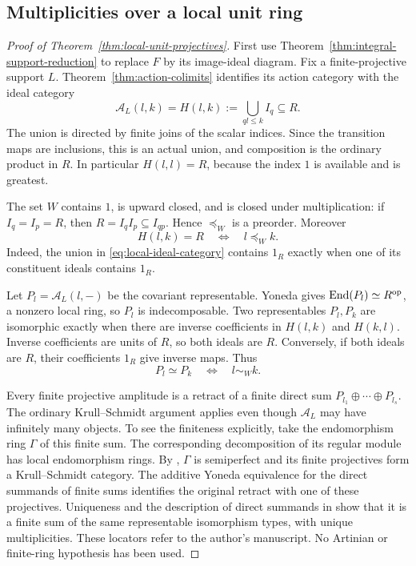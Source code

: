 \subsection{Multiplicities over a local unit ring}
\label{subsec:local-unit-projectives}

\begin{proof}[Proof of Theorem~\ref{thm:local-unit-projectives}]
First use Theorem~\ref{thm:integral-support-reduction} to replace $F$ by
its image-ideal diagram. Fix a finite-projective support $L$.
Theorem~\ref{thm:action-colimits} identifies its action category with
the ideal category
\begin{equation}\label{eq:local-ideal-category}
 \mathcal A_L(l,k)=H(l,k):=\bigcup_{ql\leq k}I_q\subseteq R.
\end{equation}
The union is directed by finite joins of the scalar indices. Since the
transition maps are inclusions, this is an actual union, and composition
is the ordinary product in $R$. In particular $H(l,l)=R$, because the
index $1$ is available and is greatest.

The set $W$ contains $1$, is upward closed, and is closed under
multiplication: if $I_q=I_p=R$, then
$R=I_qI_p\subseteq I_{qp}$. Hence $\preceq_W$ is a preorder. Moreover
\[
 H(l,k)=R\quad\Longleftrightarrow\quad l\preceq_W k.
\]
Indeed, the union in \eqref{eq:local-ideal-category} contains $1_R$
exactly when one of its constituent ideals contains $1_R$.

Let $P_l=\mathcal A_L(l,-)$ be the covariant representable. Yoneda gives
$\operatorname{End}(P_l)\simeq R^{\mathrm{op}}$, a nonzero local ring, so $P_l$ is
indecomposable. Two representables $P_l,P_k$ are isomorphic exactly
when there are inverse coefficients in $H(l,k)$ and $H(k,l)$.
Inverse coefficients are units of $R$, so both ideals are $R$.
Conversely, if both ideals are $R$, their coefficients $1_R$ give
inverse maps. Thus
\[
 P_l\simeq P_k\quad\Longleftrightarrow\quad l\sim_W k.
\]

Every finite projective amplitude is a retract of a finite direct sum
$P_{l_1}\oplus\cdots\oplus P_{l_s}$. The ordinary Krull--Schmidt
argument applies even though $\mathcal A_L$ may have infinitely many
objects. To see the finiteness explicitly, take the endomorphism ring
$\Gamma$ of this finite sum. The corresponding decomposition of its
regular module has local endomorphism rings. By
\cite[Proposition~4.1, pp.~8--9]{Krause}, $\Gamma$ is semiperfect and
its finite projectives form a Krull--Schmidt category. The additive
Yoneda equivalence for the direct summands of finite sums identifies
the original retract with one of these projectives. Uniqueness and
the description of direct summands in
\cite[Theorem~4.2 and Corollary~4.3, p.~9]{Krause} show that it is a
finite sum of the same representable isomorphism types, with unique
multiplicities. These locators refer to the author's manuscript. No
Artinian or finite-ring hypothesis has been used.


\end{proof}
